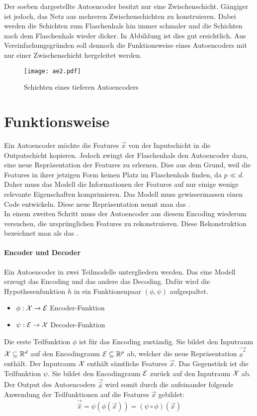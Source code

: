 \para{}
Der soeben dargestellte Autoencoder besitzt nur eine Zwischenschicht.
Gängiger ist jedoch, das Netz aus mehreren Zwischenschichten zu konstruieren. Dabei
werden die Schichten zum Flaschenhals hin immer schmaler und die Schichten nach
dem Flaschenhals wieder dicker. In Abbildung 
ist dies gut ersichtlich.
Aus Vereinfachungsgründen soll dennoch die Funktionsweise eines Autoencoders mit
nur einer Zwischenschicht hergeleitet werden.
\para{}
\begin{figure}[h!]
  \centering
  \texttt{[image: ae2.pdf]}
  \caption{Schichten eines tieferen Autoencoders}
  \label{fig:big_autoencoder}
\end{figure}

\section{Funktionsweise}
Ein Autoencoder möchte die Features $\vec{x}$ von der Inputschicht in die
Outputschicht kopieren. Jedoch zwingt der Flaschenhals den Autoencoder dazu, eine
neue Repräsentation der Features zu erlernen. Dies aus dem Grund, weil die
Features in ihrer jetzigen Form keinen Platz im Flaschenhals finden, da $p \ll d$.
Daher muss das Modell die Informationen der Features
auf nur einige wenige relevante Eigenschaften komprimieren.
Das Modell muss gewissermassen einen Code entwickeln.
Diese neue Repräsentation nennt man das . \\
In einem zweiten Schritt muss der Autoencoder aus diesem Encoding wiederum
versuchen, die ursprünglichen Features zu rekonstruieren. Diese Rekonstruktion
bezeichnet man als das .

\paragraph{Encoder und Decoder}
Ein Autoencoder in zwei Teilmodelle untergliedern werden. Das
eine Modell erzeugt das Encoding und das andere das Decoding. Dafür wird
die Hypothesenfunktion $h$ in ein Funktionenpaar $(\phi,\psi)$ aufgespaltet.
\begin{itemize}
\item{$\phi: \mathcal{X} \to \mathcal{E}$ Encoder-Funktion}
\item{$\psi: \mathcal{E} \to \mathcal{X}$ Decoder-Funktion}
\end{itemize}
Die erste Teilfunktion $\phi$ ist für das Encoding zuständig. Sie
bildet den Inputraum $\mathcal{X} \subseteq \mathbb{R}^d$ auf
den Encodingraum $\mathcal{E} \subseteq \mathbb{R}^p$ ab, welcher die neue
Repräsentation $\vec{x^*}$ enthält. Der Inputraum $\mathcal{X}$ enthält
sämtliche Features $\vec{x}$.
\para{}
Das Gegenstück ist die Teilfunktion $\psi$. Sie bildet den Encodingraum
$\mathcal{E}$ zurück auf den Inputraum $\mathcal{X}$ ab.
\para{}
Der Output des Autoencoders $\vec{\hat{x}}$ wird somit durch die aufeinander
folgende Anwendung der Teilfunktionen auf die Features $\vec{x}$ gebildet:
\begin{equation}
  \vec{\hat{x}} = \psi(\phi(\vec{x})) = (\psi \circ \phi)(\vec{x})
\end{equation}

